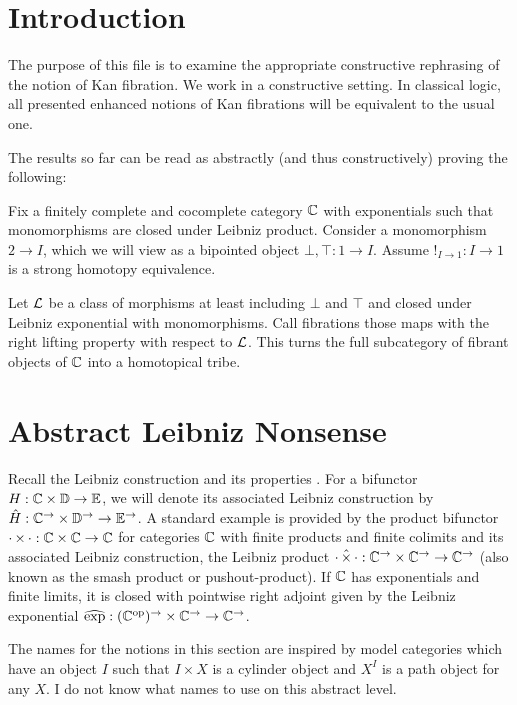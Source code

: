 \documentclass[reqno,10pt,a4paper,oneside]{amsart}
\begin{document}
\section{Introduction}

The purpose of this file is to examine the appropriate constructive rephrasing of the notion of Kan fibration.
We work in a constructive setting.
In classical logic, all presented enhanced notions of Kan fibrations will be equivalent to the usual one. 

The results so far can be read as abstractly (and thus constructively) proving the following:

\begin{theorem}
\label{abstract-homotopical-tribe}
Fix a finitely complete and cocomplete category $\mathbb{C}$ with exponentials such that monomorphisms are closed under Leibniz product.
Consider a monomorphism $2 \to I$, which we will view as a bipointed object $\bot, \top : 1 \to I$.
Assume $!_{I \to 1} : I \to 1$ is a strong homotopy equivalence.

Let $\mathcal{L}$ be a class of morphisms at least including $\bot$ and $\top$ and closed under Leibniz exponential with monomorphisms.
Call fibrations those maps with the right lifting property with respect to $\mathcal{L}$.
This turns the full subcategory of fibrant objects of $\mathbb{C}$ into a homotopical tribe.
\end{theorem}

\section{Abstract Leibniz Nonsense}

Recall the Leibniz construction and its properties \cite[Section 4]{riehl-verity:reedy}.
For a bifunctor $H : \mathbb{C} \times \mathbb{D} \to \mathbb{E}$, we will denote its associated Leibniz construction by $\hat{H} : \mathbb{C}^{\to} \times \mathbb{D}^{\to} \to \mathbb{E}^{\to}$.
A standard example is provided by the product bifunctor $\mathop{\cdot} \times \mathop{\cdot} : \mathbb{C} \times \mathbb{C} \to \mathbb{C}$ for categories $\mathbb{C}$ with finite products and finite colimits and its associated Leibniz construction, the Leibniz product $\mathop{\cdot} \mathbin{\hat{\times}} \mathop{\cdot} : \mathbb{C}^{\to} \times \mathbb{C}^{\to} \to \mathbb{C}^{\to}$ (also known as the smash product or pushout-product).
If $\mathbb{C}$ has exponentials and finite limits, it is closed with pointwise right adjoint given by the Leibniz exponential $\operatorname{\widehat{exp}} : (\mathbb{C}^{\mathrm{op}})^{\to} \times \mathbb{C}^{\to} \to \mathbb{C}^{\to}$.

The names for the notions in this section are inspired by model categories which have an object $I$ such that $I \times X$ is a cylinder object and $X^I$ is a path object for any $X$.
I do not know what names to use on this abstract level.
\end{document}
